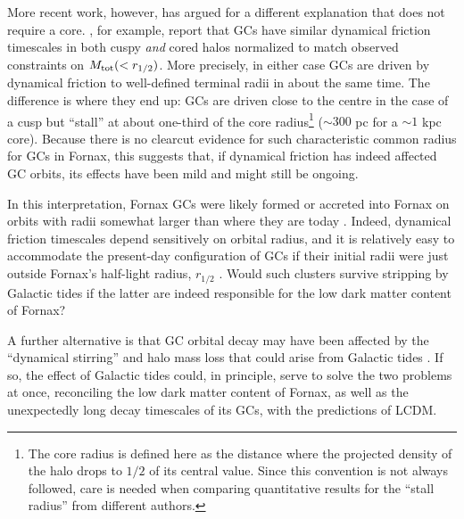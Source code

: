\documentclass[fleqn,usenatbib]{mnras}
\begin{document}
More recent work, however, has argued for a different explanation that does not require a core. \citet{Meadows2020}, for example, report that GCs have similar dynamical friction timescales  in both cuspy {\it and} cored halos normalized to match observed constraints on $M_{\rm tot}(<r_{1/2})$. More precisely,  in either case GCs are driven by dynamical friction to well-defined terminal radii in about the same time. The difference is where they end up: GCs are driven close to the centre in the case of a cusp but ``stall'' at about one-third of the core radius\footnote{The core radius is defined here as the distance where the projected density of the halo drops to $1/2$ of its central value. Since this convention is not always followed, care is needed when comparing quantitative results for the ``stall radius'' from different authors.}  ($\sim 300$ pc for a $\sim 1$ kpc core).
Because there is no clearcut evidence for such characteristic common radius for GCs in Fornax, this suggests that, if dynamical friction has indeed affected GC orbits, its effects have been mild and might still be ongoing.

In this interpretation, Fornax GCs were likely formed or accreted into Fornax on orbits with radii somewhat larger than where they are today \citep[][]{Angus2009,Boldrini2019}. Indeed, dynamical friction timescales depend sensitively on orbital radius, and it is relatively easy to accommodate the present-day configuration of GCs if their initial radii were just outside Fornax's half-light radius, $r_{1/2}$ \citep{Meadows2020}. Would such clusters survive stripping by Galactic tides if the latter are indeed responsible for the low dark matter content of Fornax?

A further alternative is that GC orbital decay may have been affected by the ``dynamical stirring'' and halo mass loss that could arise from Galactic tides \citep{Oh2000}. If so, the effect of Galactic tides could, in principle, serve to solve the two problems at once, reconciling the low dark matter content of Fornax, as well as the unexpectedly long decay timescales of its GCs, with the predictions of LCDM.
\end{document}
